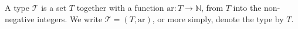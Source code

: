 A type $\mathcal{T}$ is a set $T$ together with a function $\text{ar}: T \to \mathbb{N}$, from $T$ into the non-negative integers. We write $\mathcal{T} = (T, \text{ar})$, or more simply, denote the type by $T$.
